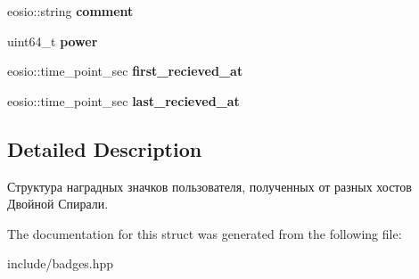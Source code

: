 \begin{DoxyCompactItemize}
\mbox{\label{structusbadges_ac570f50eaa4fd0cc045c7fc81e92b291}} 
eosio\+::string {\bfseries comment}
\item 
\mbox{\label{structusbadges_a8b27ed20b270269c5e228dd6b8284bfa}} 
uint64\+\_\+t {\bfseries power}
\item 
\mbox{\label{structusbadges_a1c3a798d3506940e9528deb4d90a54f5}} 
eosio\+::time\+\_\+point\+\_\+sec {\bfseries first\+\_\+recieved\+\_\+at}
\item 
\mbox{\label{structusbadges_a8981791289d1c3e1b5e2047770e83de4}} 
eosio\+::time\+\_\+point\+\_\+sec {\bfseries last\+\_\+recieved\+\_\+at}
\end{DoxyCompactItemize}


\subsection{Detailed Description}
Структура наградных значков пользователя, полученных от разных хостов Двойной Спирали. 

The documentation for this struct was generated from the following file\+:\begin{DoxyCompactItemize}
\item 
include/badges.\+hpp\end{DoxyCompactItemize}
